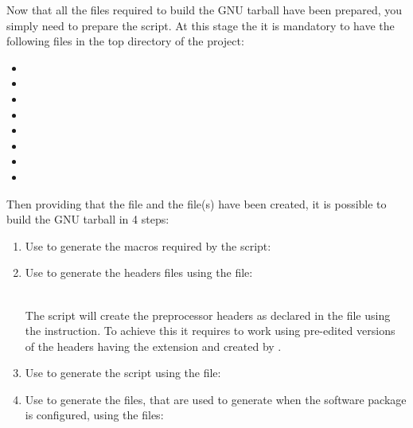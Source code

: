 Now that all the files required to build the GNU tarball have been prepared, you simply need to prepare the  script. 
At this stage the it is mandatory to have the following files in the top directory of the project: 
\begin{itemize}
\item {}
\item {}
\item {}
\item {}
\item {}
\item {}
\item {} 
\item {}
\end{itemize}
Then providing that the file  and the file(s)  have been created, 
it is possible to build the GNU tarball in 4 steps: \\
\begin{enumerate}
\item Use  to generate the macros required by the  script:
{\footnotesize{
\begin{scripti}
 
\end{scripti}
}}
\item Use  to generate the headers  files using the  file:
{\footnotesize{
\begin{scripti}
 
\end{scripti}
}}
\\
\noindent The  script will create the preprocessor headers as declared in the  file using the  instruction. 
To achieve this it requires to work using pre-edited versions of the headers having the  extension and created by .
\newpage
\item Use  to generate the  script using the  file:
{\footnotesize{
\begin{scripti}
 
\end{scripti}
}}
\item Use  to generate the  files, that are used to generate  when the software package is configured, using the  files:
{\footnotesize{
\begin{scripti}
 
\end{scripti}
}}
\end{enumerate}

